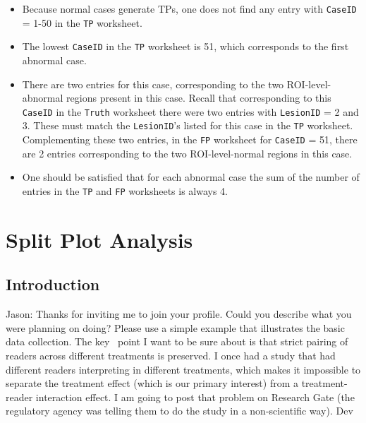 \documentclass[]{book}
\providecommand{\tightlist}{%
  \setlength{\itemsep}{0pt}\setlength{\parskip}{0pt}}
\begin{document}
\begin{itemize}
  \begin{itemize}
  \tightlist
  \item
    Because normal cases generate TPs, one does not find any entry with \texttt{CaseID} = 1-50 in the \texttt{TP} worksheet.\\
  \item
    The lowest \texttt{CaseID} in the \texttt{TP} worksheet is 51, which corresponds to the first abnormal case.\\
  \item
    There are two entries for this case, corresponding to the two ROI-level-abnormal regions present in this case. Recall that corresponding to this \texttt{CaseID} in the \texttt{Truth} worksheet there were two entries with \texttt{LesionID} = 2 and 3. These must match the \texttt{LesionID}'s listed for this case in the \texttt{TP} worksheet. Complementing these two entries, in the \texttt{FP} worksheet for \texttt{CaseID} = 51, there are 2 entries corresponding to the two ROI-level-normal regions in this case.\\
  \item
    One should be satisfied that for each abnormal case the sum of the number of entries in the \texttt{TP} and \texttt{FP} worksheets is always 4.
  \end{itemize}
\end{itemize}

\hypertarget{split-plot-analysis}{%
\chapter{Split Plot Analysis}\label{split-plot-analysis}}

\hypertarget{introduction-2}{%
\section{Introduction}\label{introduction-2}}

Jason:
Thanks for inviting me to join your profile. Could you describe what you were planning on doing? Please use a simple example that illustrates the basic data collection. The key ~point I want to be sure about is that strict pairing of readers across different treatments is preserved. I once had a study that had different readers interpreting in different treatments, which makes it impossible to separate the treatment effect (which is our primary interest) from a treatment-reader interaction effect. I am going to post that problem on Research Gate (the regulatory agency was telling them to do the study in a non-scientific way). Dev
\end{document}
